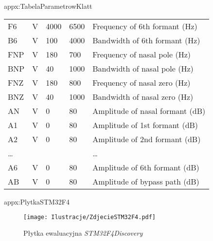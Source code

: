 \begin{zalacznik}{appx:TabelaParametrowKlatt}{\visibletrue}
\begin{table}[!hbp]
\begin{minipage}{\textwidth}
\begin{tabular}{lllll}
					F6 & V & 4000 & 6500 & Frequency of 6th formant (Hz) \\
					B6 & V & 100 & 4000 & Bandwidth of 6th formant (Hz) \\
					FNP & V & 180 & 700 & Frequency of nasal pole (Hz) \\
					BNP & V & 40 & 1000 & Bandwidth of nasal pole (Hz) \\
					FNZ & V & 180 & 800 & Frequency of nasal zero (Hz) \\
					BNZ & V & 40 & 1000 & Bandwidth of nasal zero (Hz) \\
					AN & V & 0 & 80 & Amplitude of nasal formant (dB) \\
					A1 & V & 0 & 80 & Amplitude of 1st formant (dB) \\
					A2 & V & 0 & 80 & Amplitude of 2nd formant (dB) \\
					\ldots &&&& \ldots \\
					A6 & V & 0 & 80 & Amplitude of 6th formant (dB) \\
					AB & V & 0 & 80 & Amplitude of bypass path (dB) \\
					\bottomrule[1.5pt]
				\end{tabular}\par
				\vspace{-0.75\skip\footins}
				\renewcommand{\footnoterule}{}
			\end{minipage}
		\end{table}
	\end{zalacznik}
	
	\begin{zalacznik}{appx:PlytkaSTM32F4}{\visibletrue}
		\begin{figure}[ht!]
			\centering
			\texttt{[image: Ilustracje/ZdjecieSTM32F4.pdf]}
			\caption{Płytka ewaluacyjna \textit{STM32F4Discovery}}
			\label{fig:PlytkaSTM32F4}
		\end{figure}
	\end{zalacznik}
	

